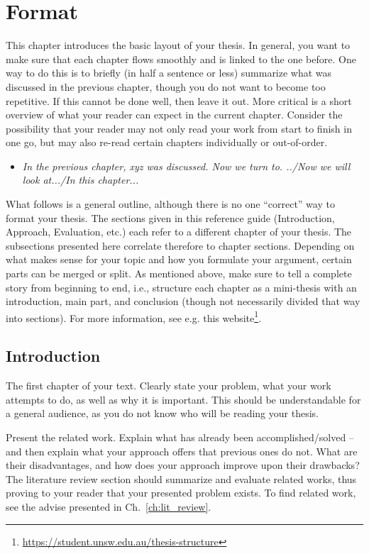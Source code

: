 \chapter{Format} \label{ch:format}
This chapter introduces the basic layout of your thesis.
In general, you want to make sure that each chapter flows smoothly and is linked to the one before.
One way to do this is to briefly (in half a sentence or less) summarize what was discussed in the previous chapter, though you do not want to become
too repetitive.
If this cannot be done well, then leave it out.
More critical is a short overview of what your reader can expect in the current chapter.
Consider the possibility that your reader may not only read your work from start to finish in one go, but may also re-read certain chapters
individually or out-of-order.

\begin{itemize}
	\item \textit{In the previous chapter, xyz was discussed.
		      Now we turn to.
		      ../Now we will look at.../In this chapter...}
\end{itemize}

What follows is a general outline, although there is no one ``correct'' way to format your thesis.
The sections given in this reference guide (Introduction, Approach, Evaluation, etc.) each refer to a different chapter of your thesis.
The subsections presented here correlate therefore to chapter sections.
Depending on what makes sense for your topic and how you formulate your argument, certain parts can be merged or split.
As mentioned above, make sure to tell a complete story from beginning to end, i.e., structure each chapter as a mini-thesis with an introduction,
main part, and conclusion (though not necessarily divided that way into sections).
For more information, see e.g. this website\footnote{\url{https://student.unsw.edu.au/thesis-structure}}.

\section{Introduction} \label{sec:intro}
The first chapter of your text.
Clearly state your problem, what your work attempts to do, as well as why it is important.
This should be understandable for a general audience, as you do not know who will be reading your thesis.

Present the related work.
Explain what has already been accomplished/solved -- and then explain what your approach offers that previous ones do not.
What are their disadvantages, and how does your approach improve upon their drawbacks?
The literature review section should summarize and evaluate related works, thus proving to your reader that your presented problem exists.
To find related work, see the advise presented in Ch.~\ref{ch:lit_review}.

